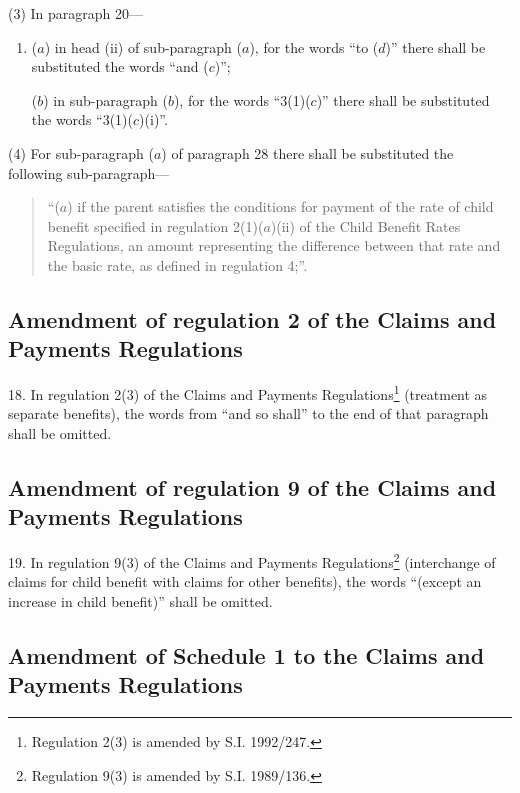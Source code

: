 \documentclass[a4paper]{article}
\begin{document}
(3) In paragraph 20—
\begin{enumerate}\item[]
($a$) in head (ii) of sub-paragraph ($a$), for the words “to ($d$)” there shall be substituted the words “and ($c$)”;

($b$) in sub-paragraph ($b$), for the words “3(1)($c$)” there shall be substituted the words “3(1)($c$)(i)”.
\end{enumerate}

(4) For sub-paragraph ($a$) of paragraph 28 there shall be substituted the following sub-paragraph—
\begin{quotation}
“($a$) if the parent satisfies the conditions for payment of the rate of child benefit specified in regulation 2(1)($a$)(ii) of the Child Benefit Rates Regulations, an amount representing the difference between that rate and the basic rate, as defined in regulation 4;”.
\end{quotation}

\subsection[18. Amendment of regulation 2 of the Claims and Payments Regulations]{Amendment of regulation 2 of the Claims and Payments Regulations}

18.  In regulation 2(3) of the Claims and Payments Regulations\footnote{\frenchspacing Regulation 2(3) is amended by S.I. 1992/247.} (treatment as separate benefits), the words from “and so shall” to the end of that paragraph shall be omitted.

\subsection[19. Amendment of regulation 9 of the Claims and Payments Regulations]{Amendment of regulation 9 of the Claims and Payments Regulations}

19.  In regulation 9(3) of the Claims and Payments Regulations\footnote{\frenchspacing Regulation 9(3) is amended by S.I. 1989/136.} (interchange of claims for child benefit with claims for other benefits), the words “(except an increase in child benefit)” shall be omitted.

\subsection[20. Amendment of Schedule 1 to the Claims and Payments Regulations]{Amendment of Schedule 1 to the Claims and Payments Regulations}
\end{document}

